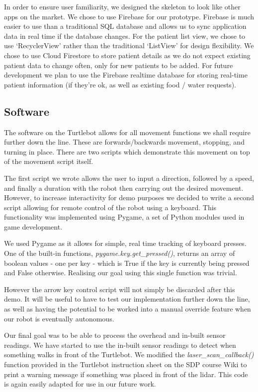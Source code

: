 \documentclass{article}
\begin{document}
In order to ensure user familiarity, we designed the skeleton to look like other apps on the market. We chose to use Firebase for our prototype. Firebase is much easier to use than a traditional SQL database and allows us to sync application data in real time if the database changes. For the patient list view, we chose to use `RecyclerView' rather than the traditional `ListView' for design flexibility. We chose to use Cloud Firestore to store patient details as we do not expect existing patient data to change often, only for new patients to be added. For future development we plan to use the Firebase realtime database for storing real-time patient information (if they're ok, as well as existing food / water requests).

\subsection{Software}

The software on the Turtlebot allows for all movement functions we shall require further down the line. These are forwards/backwards movement, stopping, and turning in place. There are two scripts which demonstrate this movement on top of the movement script itself.

The first script we wrote allows the user to input a direction, followed by a speed, and finally a duration with the robot then carrying out the desired movement. However, to increase interactivity for demo purposes we decided to write a second script allowing for remote control of the robot using a keyboard. This functionality was implemented using Pygame, a set of Python modules used in game development.

We used Pygame as it allows for simple, real time tracking of keyboard presses. One of the built-in functions, {\it pygame.key.get\_pressed()}, returns an array of boolean values - one per key - which is True if the key is currently being pressed and False otherwise. Realising our goal using this single function was trivial.

However the arrow key control script will not simply be discarded after this demo. It will be useful to have to test our implementation further down the line, as well as having the potential to be worked into a manual override feature when our robot is eventually autonomous.

Our final goal was to be able to process the overhead and in-built sensor readings. We have started to use the in-built sensor readings to detect when something walks in front of the Turtlebot. We modified the {\it laser\_scan\_callback()} function provided in the Turtlebot instruction sheet on the SDP course Wiki \cite{sdpwiki} to print a warning message if something was placed in front of the lidar. This code is again easily adapted for use in our future work.
\end{document}
